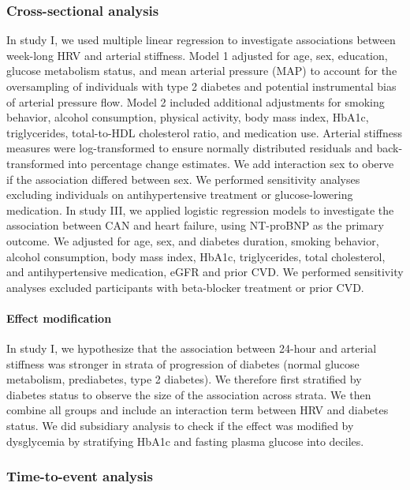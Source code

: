 \documentclass[
  a4paper,
  headsepline=true,
  open=any]{scrbook}
\let\oldparagraph\paragraph
\renewcommand{\paragraph}[1]{\oldparagraph{#1}\mbox{}}
\begin{document}
\hypertarget{cross-sectional-analysis}{%
\subsubsection{Cross-sectional
analysis}\label{cross-sectional-analysis}}

In study I, we used multiple linear regression to investigate
associations between week-long HRV and arterial stiffness. Model 1
adjusted for age, sex, education, glucose metabolism status, and mean
arterial pressure (MAP) to account for the oversampling of individuals
with type 2 diabetes and potential instrumental bias of arterial
pressure flow. Model 2 included additional adjustments for smoking
behavior, alcohol consumption, physical activity, body mass index,
HbA1c, triglycerides, total-to-HDL cholesterol ratio, and medication
use. Arterial stiffness measures were log-transformed to ensure normally
distributed residuals and back-transformed into percentage change
estimates. We add interaction sex to oberve if the association differed
between sex. We performed sensitivity analyses excluding individuals on
antihypertensive treatment or glucose-lowering medication. In study III,
we applied logistic regression models to investigate the association
between CAN and heart failure, using NT-proBNP as the primary outcome.
We adjusted for age, sex, and diabetes duration, smoking behavior,
alcohol consumption, body mass index, HbA1c, triglycerides, total
cholesterol, and antihypertensive medication, eGFR and prior CVD. We
performed sensitivity analyses excluded participants with beta-blocker
treatment or prior CVD.

\hypertarget{effect-modification}{%
\paragraph{Effect modification}\label{effect-modification}}

In study I, we hypothesize that the association between 24-hour and
arterial stiffness was stronger in strata of progression of diabetes
(normal glucose metabolism, prediabetes, type 2 diabetes). We therefore
first stratified by diabetes status to observe the size of the
association across strata. We then combine all groups and include an
interaction term between HRV and diabetes status. We did subsidiary
analysis to check if the effect was modified by dysglycemia by
stratifying HbA1c and fasting plasma glucose into deciles.

\hypertarget{time-to-event-analysis}{%
\subsubsection{Time-to-event analysis}\label{time-to-event-analysis}}
\end{document}
